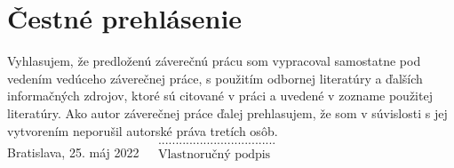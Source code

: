 \null
\vfill
\noindent
\section*{Čestné prehlásenie}

Vyhlasujem, že predloženú záverečnú prácu som vypracoval samostatne pod vedením vedúceho záverečnej práce, s použitím odbornej literatúry a ďalších informačných zdrojov, ktoré sú citované v práci a uvedené v zozname použitej literatúry. Ako autor záverečnej práce ďalej prehlasujem, že som v súvislosti s jej vytvorením neporušil autorské práva tretích osôb.\\

\noindent Bratislava, 25. máj 2022 \hfill $\begin{array}{rl}
                                          &\text{..................................}\\
                                          &\text{Vlastnoručný podpis}\\
                                           \end{array}$
\cleardoublepage


	
